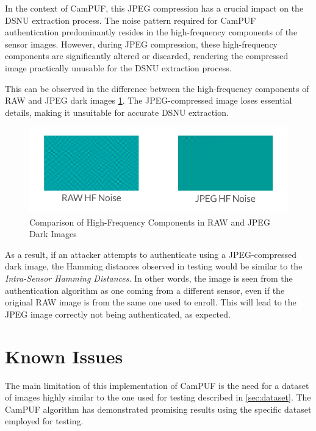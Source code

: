In the context of CamPUF, this JPEG compression has a crucial impact on the DSNU extraction process. The noise pattern required for CamPUF authentication predominantly resides in the high-frequency components of the sensor images. However, during JPEG compression, these high-frequency components are significantly altered or discarded, rendering the compressed image practically unusable for the DSNU extraction process.

This can be observed in the difference between the high-frequency components of RAW and JPEG dark images \ref{fig:jpeg_comp}. The JPEG-compressed image loses essential details, making it unsuitable for accurate DSNU extraction.

\begin{figure}[h!]
	\centering
	\vspace{0.5cm}
	\includegraphics{images/jpeg_vs_raw_HF.png}
	\caption{Comparison of High-Frequency Components in RAW and JPEG Dark Images}
	\label{fig:jpeg_comp}
\end{figure}

As a result, if an attacker attempts to authenticate using a JPEG-compressed dark image, the Hamming distances observed in testing would be similar to the \emph{Intra-Sensor Hamming Distances}. In other words, the image is seen from the authentication algorithm as one coming from a different sensor, even if the original RAW image is from the same one used to enroll. This will lead to the JPEG image correctly not being authenticated, as expected.

\section{Known Issues}
The main limitation of this implementation of CamPUF is the need for a dataset of images highly similar to the one used for testing described in \ref{sec:dataset}. The CamPUF algorithm has demonstrated promising results using the specific dataset employed for testing.

